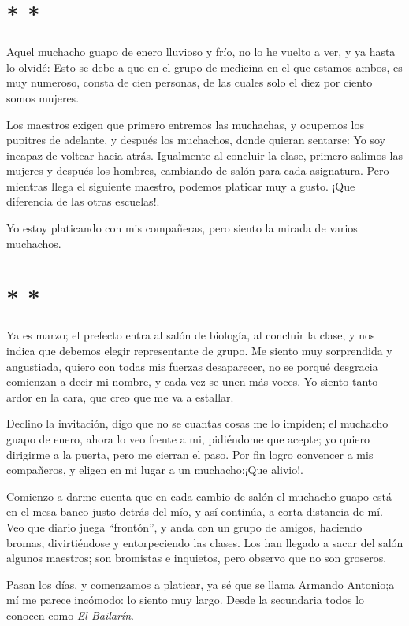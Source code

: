 \documentclass[letterpaper, 12pt]{book}
\begin{document}
\section*{\centering * * *}
Aquel muchacho guapo de enero lluvioso y frío, no lo he vuelto a ver, y ya hasta lo olvidé: Esto se debe a que en el grupo de medicina en el que estamos ambos, es muy numeroso, consta de cien personas, de las cuales solo el diez por ciento somos mujeres.

Los maestros exigen que primero entremos las muchachas, y ocupemos los pupitres de adelante, y después los muchachos, donde quieran sentarse: Yo soy incapaz de voltear hacia atrás. Igualmente al concluir la clase, primero salimos las mujeres y después los hombres, cambiando de salón para cada asignatura. Pero mientras llega el siguiente maestro, podemos platicar muy a gusto. ¡Que diferencia de las otras escuelas!. 

Yo estoy platicando con mis compañeras, pero siento la mirada de varios muchachos.

\section*{\centering * * *}
Ya es marzo; el prefecto entra al salón de biología, al concluir la clase, y nos indica que debemos elegir representante de grupo. Me siento muy sorprendida y angustiada, quiero con todas mis fuerzas desaparecer, no se porqué desgracia comienzan a decir mi nombre, y cada vez se unen más voces. Yo siento tanto ardor en la cara, que creo que me va a estallar.

Declino la invitación, digo que no se cuantas cosas me lo impiden; el muchacho guapo de enero, ahora lo veo frente a mi, pidiéndome que acepte; yo quiero dirigirme a la puerta, pero me cierran el paso. Por fin logro convencer a mis compañeros, y eligen en mi lugar a un muchacho:¡Que alivio!.

Comienzo a darme cuenta que en cada cambio de salón el muchacho guapo está en el mesa-banco justo detrás del mío, y así continúa, a corta distancia de mí. Veo que diario juega ``frontón'', y anda con un grupo de amigos, haciendo bromas, divirtiéndose y entorpeciendo las clases. Los han llegado a sacar del salón algunos maestros; son bromistas e inquietos, pero observo que no son groseros.

Pasan los días, y comenzamos a platicar, ya sé que se llama Armando Antonio;a mí me parece incómodo: lo siento muy largo. Desde la secundaria todos lo conocen como \textit{El Bailarín}.
\end{document}
